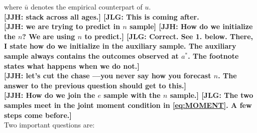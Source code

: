 \noindent where $\bar{u}$ denotes the empirical counterpart of $u$.\\

\noindent \textbf{[JJH: stack across all ages.] [JLG: This is coming after.}\\


\noindent \textbf{[JJH: we are trying to predict in $n$ sample] [JJH: How do we initialize the $n$? We are using $n$ to predict.] [JLG: Correct. See 1. below. There, I state how do we initialize in the auxiliary sample. The auxiliary sample always contains the outcomes observed at $a^*$. The footnote states what happens when we do not.]}\\

\noindent \textbf{[JJH: let's cut the chase ---you never say how you forecast $n$. The answer to the previous question should get to this.]}\\

\noindent \textbf{[JJH: How do we join the $e$ sample with the $n$ sample.] [JLG: The two samples meet in the joint moment condition in \eqref{eq:MOMENT}. A few steps come before.]}\\

\noindent Two important questions are:

